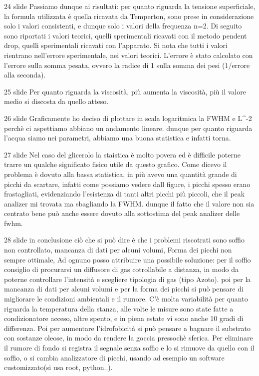 24 slide
Passiamo dunque ai risultati: per quanto riguarda la tensione superficiale, la formula utilizzata è quella ricavata da Temperton, sono prese in considerazione solo i valori consistenti, e dunque solo i valori della frequenza n=2.
Di seguito sono riportati i valori teorici, quelli sperimentali ricavati con il metodo pendent drop, quelli sperimentali ricavati con l'apparato. Si nota che tutti i valori rientrano nell'errore sperimentale, nei valori teorici. L'errore è stato calcolato con l'errore sulla somma pesata, ovvero la radice di 1 sulla somma dei pesi (1/errore alla seconda).

25 slide
Per quanto riguarda la viscosità, più aumenta la viscosità, più il valore medio si discosta da quello atteso.

26 slide
Graficamente ho deciso di plottare in scala logaritmica la FWHM e L^-2 perchè ci aspettiamo abbiano un andamento lineare. dunque per quanto riguarda l'acqua siamo nei parametri, abbiamo una buona statistica e infatti torna. 

27 slide
Nel caso del glicerolo la staistica è molto povera ed è difficile poterne trarre un qualche significato fisico utile da questo grafico. Come dicevo il problema è dovuto alla bassa statistica, in più avevo una quantità grande di picchi da scartare, infatti come possiamo vedere dall figure, i picchi spesso erano frastagliati, evidenziando l'esistenza di tanti altri picchi più piccoli, che il peak analizer mi trovata ma sbagliando la FWHM. dunque il fatto che il valore non sia centrato bene può anche essere dovuto alla sottostima del peak analizer delle fwhm.

28 slide
in conclusione ciò che si può dire è che i problemi riscotrati sono soffio non controllato, mancanza di dati per alcuni volumi, Forma dei picchi non sempre ottimale, Ad ognuno posso attribuire una possibile soluzione: per il soffio consiglio di procurarsi  un diffusore di gas cotrollabile a distanza, in modo da poterne controllare l'intensità e scegliere tipologia di gas (tipo Azoto). poi per la mancanza di dati per alcuni volumi e  per la forma dei picchi si può pensare di migliorare le condizioni ambientali e il rumore. C'è molta variabilità per quanto riguarda la temperatura della stanza, alle volte le misure sono state fatte a condizionatore acceso, altre spento, e in piena estate vi sono anche 10 gradi di differenza. Poi per aumentare l'idrofobicità si può pensare a bagnare il substrato con sostanze oleose, in modo da  rendere la goccia pressochè sferica. Per eliminare il rumore di fondo si registra il segnale senza soffio e lo si rimuove da quello con il soffio, o si cambia analizzatore di picchi, usando ad esempio un software customizzato(si usa root, python..).

